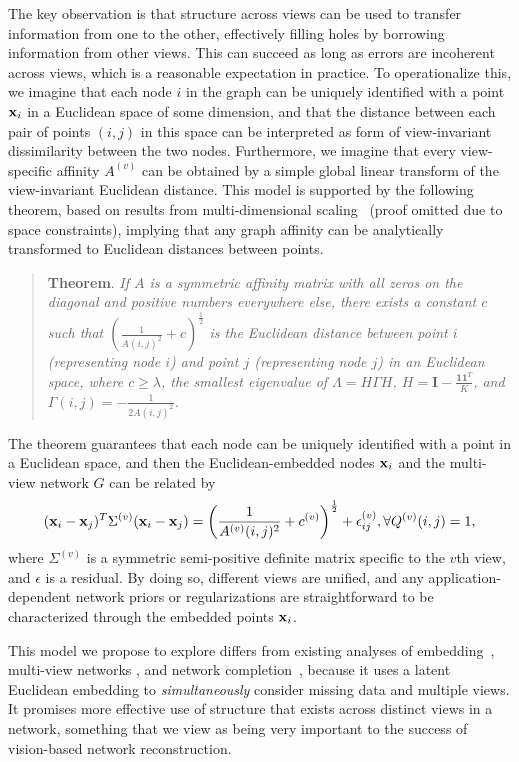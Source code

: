 The key observation is that structure across views can be used to transfer information from one to the other, effectively filling holes by borrowing information from other views. This can succeed as long as errors are incoherent across views, which is a reasonable expectation in practice. To operationalize this, we imagine that each node $i$ in the graph can be uniquely identified with a point ${\bf x}_i$ in a Euclidean space of some dimension, and that the distance between each pair of points $(i,j)$ in this space can be interpreted as form of  view-invariant dissimilarity between the two nodes. Furthermore, we imagine that every view-specific affinity $A^{(v)}$ can be obtained by a simple global linear transform of the view-invariant Euclidean distance. This model is supported by the following theorem, based on results from multi-dimensional scaling~\cite{CoxMDS} (proof omitted due to space constraints), implying that any graph affinity can be analytically transformed to Euclidean distances between points.

\begin{quote}
\textbf{Theorem}. \textit{If $A$ is a symmetric affinity matrix with all zeros on the diagonal and positive numbers everywhere else, there exists a constant $c$ such that $(\frac{1}{A(i,j)^2}+c)^{\frac{1}{2}}$ is the Euclidean distance between point $i$ (representing node $i$) and point $j$ (representing node $j$) in an Euclidean space, where $c\geq\lambda$, the smallest eigenvalue of $\Lambda=H\Gamma H$, $H=\mathbf{I}-\frac{\mathbf{1}\mathbf{1}^T}{K}$, and $\Gamma(i,j)=-\frac{1}{2A(i,j)^2}$.} 
\end{quote}

The theorem guarantees that each node can be uniquely identified with a point in a Euclidean space, and then the Euclidean-embedded nodes ${\bf x}_i$ and the multi-view network $G$ can be related by
\begin{equation}\label{eq:embed}
({\bf x}_i-{\bf x}_j)^{T}\Sigma^{(v)}({\bf x}_i-{\bf x}_j)=\left(\frac{1}{A^{(v)}(i,j)^2}+c^{(v)}\right)^{\frac{1}{2}}+\epsilon^{(v)}_{ij}, \forall Q^{(v)}(i,j)=1,
\end{equation}
where $\Sigma^{(v)}$ is a symmetric semi-positive definite matrix specific to the $v$th view, and $\epsilon$ is a residual. By doing so, different views are unified, and any application-dependent network priors or regularizations are straightforward to be characterized through the embedded points ${\bf x}_i$. 

This model we propose to explore differs from existing analyses of embedding~\cite{Hoff01latentspace,Hancocklatent}, multi-view networks \cite{AiroldiBFX08,Kim12}, and network completion~\cite{Clauset,Guimera,HannekeX09,KimL11}, because it uses a latent Euclidean embedding to \emph{simultaneously} consider missing data and multiple views. It promises more effective use of structure that exists across distinct views in a network, something that we view as being very important to the success of vision-based network reconstruction. 

